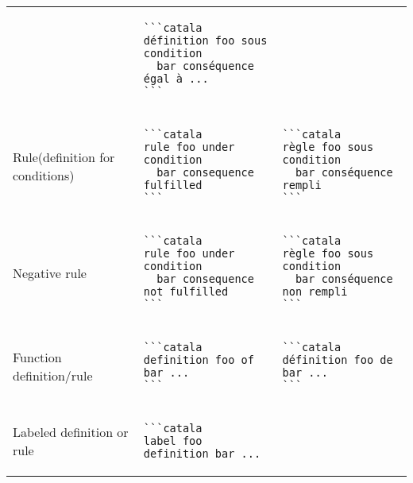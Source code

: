 \documentclass[a3paper,landscape]{article}
\begin{document}
\begin{multicols*}{2}
\begin{center}
\begin{tabular}{p{}p{}p{}}
\vspace*{-1.75em}
&
\vspace*{-1.75em}
\begin{verbatim}
```catala
définition foo sous condition
  bar conséquence égal à ...
```
\end{verbatim}
\vspace*{-1.75em}
\\
Rule\newline(definition for conditions)&
\vspace*{-1.75em}
\begin{verbatim}
```catala
rule foo under condition
  bar consequence fulfilled
```
\end{verbatim}
\vspace*{-1.75em}
&
\vspace*{-1.75em}
\begin{verbatim}
```catala
règle foo sous condition
  bar conséquence rempli
```
\end{verbatim}
\vspace*{-1.75em}
\\
Negative rule&
\vspace*{-1.75em}
\begin{verbatim}
```catala
rule foo under condition
  bar consequence not fulfilled
```
\end{verbatim}
\vspace*{-1.75em}
&
\vspace*{-1.75em}
\begin{verbatim}
```catala
règle foo sous condition
  bar conséquence non rempli
```
\end{verbatim}
\vspace*{-1.75em}
\\
Function definition/rule&
\vspace*{-1.75em}
\begin{verbatim}
```catala
definition foo of  bar ...
```
\end{verbatim}
\vspace*{-1.75em}
&
\vspace*{-1.75em}
\begin{verbatim}
```catala
définition foo de bar ...
```
\end{verbatim}
\vspace*{-1.75em}
\\
Labeled definition or rule&
\vspace*{-1.75em}
\begin{verbatim}
```catala
label foo definition bar ...

\end{verbatim}
\end{tabular}
\end{center}
\end{multicols*}
\end{document}
